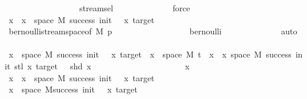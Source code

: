 \begin{isabellebody}
\ \ \ \ \ \ \ \ \ \ \ \ \ \ \ \ \ \ stream{\isachardot}{\kern0pt}sel{\isacharparenleft}{\kern0pt}{}{\isacharparenright}{\kern0pt}\isanewline
\ \ \ \ \ \ \ \ \ \ \ \ \isamarkupfalse%
\ force\isanewline
\ \ \ \ \ \ \ \ \ \ \isamarkupfalse%
\ \isamarkupfalse%
\ {\isachardoublequoteopen}x\ {\isasymin}\ {\isacharbraceleft}{\kern0pt}x\ {\isasymin}\ space\ M{\isachardot}{\kern0pt}\ success\ {\isacharparenleft}{\kern0pt}init\ {\isacharminus}{\kern0pt}\ {}{\isacharparenright}{\kern0pt}\ x\ target{\isacharbraceright}{\kern0pt}{\isachardoublequoteclose}\isanewline
\ \ \ \ \ \ \ \ \ \ \ \ \isamarkupfalse%
\ bernoulli{\isacharunderscore}{\kern0pt}stream{\isacharunderscore}{\kern0pt}space{\isacharbrackleft}{\kern0pt}of\ M\ p{\isacharbrackright}{\kern0pt}\isanewline
\ \ \ \ \ \ \ \ \ \ \ \ \ \ \ \ \ \ bernoulli\isanewline
\ \ \ \ \ \ \ \ \ \ \ \ \isamarkupfalse%
\ auto\isanewline
\ \ \ \ \ \ \ \ \isamarkupfalse%
\isanewline
\ \ \ \ \ \ \isamarkupfalse%
\ \isanewline
\ \ \ \ \ \ \ \ \isamarkupfalse%
\ {\isachardoublequoteopen}{\isacharbraceleft}{\kern0pt}x\ {\isasymin}\ space\ M{\isachardot}{\kern0pt}\ success\ {\isacharparenleft}{\kern0pt}init\ {\isacharminus}{\kern0pt}\ {}{\isacharparenright}{\kern0pt}\ x\ target{\isacharbraceright}{\kern0pt}\ {\isasymsubseteq}\ {\isacharbraceleft}{\kern0pt}x\ {\isasymin}\ space\ M{\isachardot}{\kern0pt}\ t\ {\isacharhash}{\kern0pt}{\isacharhash}{\kern0pt}\ x\ {\isasymin}\ {\isacharbraceleft}{\kern0pt}x{\isasymin}\ space\ M{\isachardot}{\kern0pt}\ success\ {\isacharparenleft}{\kern0pt}init{\isacharminus}{\kern0pt}{}{\isacharparenright}{\kern0pt}\ {\isacharparenleft}{\kern0pt}stl\ x{\isacharparenright}{\kern0pt}\ target\ {\isasymand}\ {\isasymnot}\ shd\ x{\isacharbraceright}{\kern0pt}{\isacharbraceright}{\kern0pt}{\isachardoublequoteclose}\isanewline
\ \ \ \ \ \ \ \ \isamarkupfalse%
\ \isanewline
\ \ \ \ \ \ \ \ \ \ \isamarkupfalse%
\ x\isanewline
\ \ \ \ \ \ \ \ \ \ \isamarkupfalse%
\ {\isachardoublequoteopen}x\ {\isasymin}\ {\isacharbraceleft}{\kern0pt}x\ {\isasymin}\ space\ M{\isachardot}{\kern0pt}\ success\ {\isacharparenleft}{\kern0pt}init\ {\isacharminus}{\kern0pt}\ {}{\isacharparenright}{\kern0pt}\ x\ target{\isacharbraceright}{\kern0pt}{\isachardoublequoteclose}\isanewline
\ \ \ \ \ \ \ \ \ \ \isamarkupfalse%
\ \isamarkupfalse%
\ {\isachardoublequoteopen}x\ {\isasymin}\ space\ M{\isachardoublequoteclose}{\isachardoublequoteopen}success\ {\isacharparenleft}{\kern0pt}init\ {\isacharminus}{\kern0pt}\ {}{\isacharparenright}{\kern0pt}\ x\ target{\isachardoublequoteclose}\isanewline

\end{isabellebody}
